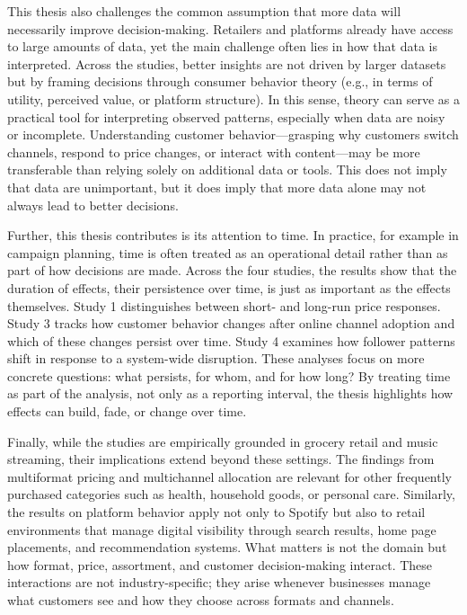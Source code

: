 This thesis also challenges the common assumption that more data will necessarily improve decision-making. Retailers and platforms already have access to large amounts of data, yet the main challenge often lies in how that data is interpreted. Across the studies, better insights are not driven by larger datasets but by framing decisions through consumer behavior theory (e.g., in terms of utility, perceived value, or platform structure). In this sense, theory can serve as a practical tool for interpreting observed patterns, especially when data are noisy or incomplete. Understanding customer behavior—grasping why customers switch channels, respond to price changes, or interact with content—may be more transferable than relying solely on additional data or tools. This does not imply that data are unimportant, but it does imply that more data alone may not always lead to better decisions.

Further, this thesis contributes is its attention to time. In practice, for example in campaign planning, time is often treated as an operational detail rather than as part of how decisions are made. Across the four studies, the results show that the duration of effects, their persistence over time, is just as important as the effects themselves. Study 1 distinguishes between short- and long-run price responses. Study 3 tracks how customer behavior changes after online channel adoption and which of these changes persist over time. Study 4 examines how follower patterns shift in response to a system-wide disruption. These analyses focus on more concrete questions: what persists, for whom, and for how long? By treating time as part of the analysis, not only as a reporting interval, the thesis highlights how effects can build, fade, or change over time.

Finally, while the studies are empirically grounded in grocery retail and music streaming, their implications extend beyond these settings. The findings from multiformat pricing and multichannel allocation are relevant for other frequently purchased categories such as health, household goods, or personal care. Similarly, the results on platform behavior apply not only to Spotify but also to retail environments that manage digital visibility through search results, home page placements, and recommendation systems. What matters is not the domain but how format, price, assortment, and customer decision-making interact. These interactions are not industry-specific; they arise whenever businesses manage what customers see and how they choose across formats and channels.

